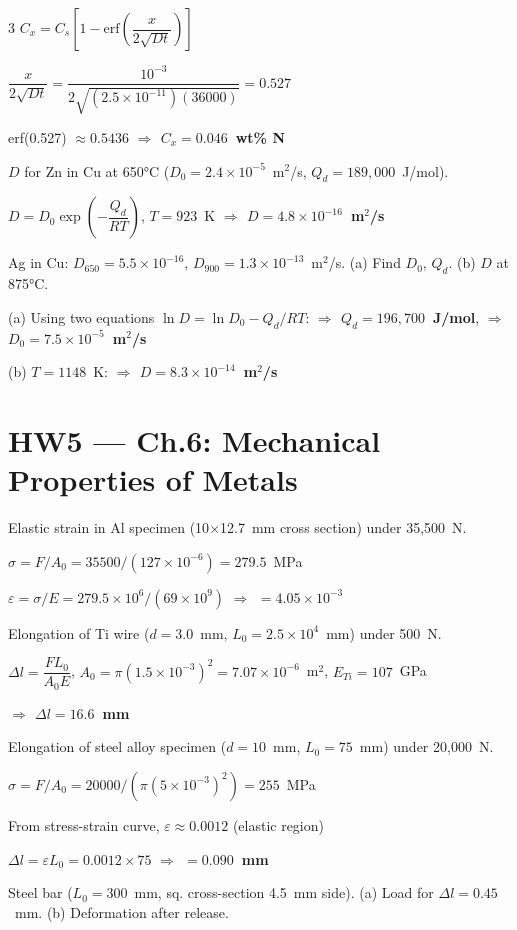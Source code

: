 \documentclass[8pt,letterpaper]{extarticle}
\newcommand{\prob}[1]{\smallskip\noindent{\footnotesize\bfseries\color{black!80} #1\quad}}
\newcommand{\soln}{\noindent{\footnotesize\itshape\color{blue!50!black}Sol: }}
\newcommand{\ans}[1]{{\footnotesize\bfseries\color{green!40!black}$\Rightarrow$ #1}}
\begin{document}
\begin{multicols*}{3}
\soln $C_x = C_s\left[1-\text{erf}\!\left(\dfrac{x}{2\sqrt{Dt}}\right)\right]$

$\dfrac{x}{2\sqrt{Dt}} = \dfrac{10^{-3}}{2\sqrt{(2.5\times10^{-11})(36000)}} = 0.527$

erf(0.527) $\approx 0.5436$ \ans{$C_x = 0.046$~wt\% N}

\prob{5.19} $D$ for Zn in Cu at 650°C ($D_0=2.4\times10^{-5}$~m$^2$/s, $Q_d=189{,}000$~J/mol).

\soln $D = D_0\exp\!\left(-\dfrac{Q_d}{RT}\right)$, $T=923$~K
\ans{$D = 4.8\times10^{-16}$~m$^2$/s}

\prob{5.24} Ag in Cu: $D_{650}=5.5\times10^{-16}$, $D_{900}=1.3\times10^{-13}$~m$^2$/s. (a) Find $D_0$, $Q_d$. (b) $D$ at 875°C.

\soln (a) Using two equations $\ln D = \ln D_0 - Q_d/RT$:
\ans{$Q_d = 196{,}700$~J/mol}, \ans{$D_0=7.5\times10^{-5}$~m$^2$/s}

(b) $T=1148$~K: \ans{$D = 8.3\times10^{-14}$~m$^2$/s}

\section*{HW5 — Ch.6: Mechanical Properties of Metals}

\prob{6.3} Elastic strain in Al specimen (10$\times$12.7~mm cross section) under 35,500~N.

\soln $\sigma = F/A_0 = 35500/(127\times10^{-6}) = 279.5$~MPa

$\varepsilon = \sigma/E = 279.5\times10^6/(69\times10^9)$ \ans{$= 4.05\times10^{-3}$}

\prob{6.6} Elongation of Ti wire ($d=3.0$~mm, $L_0=2.5\times10^4$~mm) under 500~N.

\soln $\Delta l = \dfrac{FL_0}{A_0 E}$, $A_0 = \pi(1.5\times10^{-3})^2 = 7.07\times10^{-6}$~m$^2$, $E_{Ti}=107$~GPa

\ans{$\Delta l = 16.6$~mm}

\prob{6.10} Elongation of steel alloy specimen ($d=10$~mm, $L_0=75$~mm) under 20,000~N.

\soln $\sigma = F/A_0 = 20000/(\pi(5\times10^{-3})^2) = 255$~MPa

From stress-strain curve, $\varepsilon \approx 0.0012$ (elastic region)

$\Delta l = \varepsilon L_0 = 0.0012\times75$ \ans{$= 0.090$~mm}

\prob{6.28} Steel bar ($L_0=300$~mm, sq. cross-section 4.5~mm side). (a) Load for $\Delta l=0.45$~mm. (b) Deformation after release.


\end{multicols*}
\end{document}
